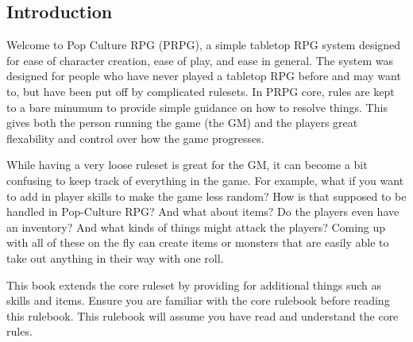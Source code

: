 \begin{flushleft}

\chapter{Introduction} \label{Introduction}

Welcome to Pop Culture RPG (PRPG), a simple tabletop RPG system designed
for ease of character creation, ease of play, and ease in general. The system
was designed for people who have never played a tabletop RPG before and may
want to, but have been put off by complicated rulesets. In PRPG core, rules are
kept to a bare minumum to provide simple guidance on how to resolve things.
This gives both the person running the game (the GM) and the players great
flexability and control over how the game progresses.

While having a very loose ruleset is great for the GM, it can become a bit
confusing to keep track of everything in the game. For example, what if you
want to add in player skills to make the game less random? How is that supposed
to be handled in Pop-Culture RPG? And what about items? Do the players even
have an inventory? And what kinds of things might attack the players? Coming up
with all of these on the fly can create items or monsters that are easily able
to take out anything in their way with one roll.

This book extends the core ruleset by providing for additional things such as
skills and items. Ensure you are familiar with the core rulebook before reading
this rulebook. This rulebook will assume you have read and understand the
core rules.

\end{flushleft}
